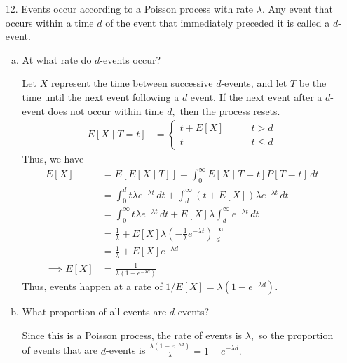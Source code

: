 \documentclass{article}
\begin{document}
\begin{itemize}
	\item[12.] Events occur according to a Poisson process with rate $\lambda.$ Any event that occurs within a time $d$ of the event that immediately preceded it is called a $d$-event.
		\begin{enumerate}[(a)]
			\item At what rate do $d$-events occur?
				\begin{soln}
					Let $X$ represent the time between successive $d$-events, and let $T$ be the time until the next event following a $d$ event. If the next event after a $d$-event does not occur within time $d,$ then the process resets.
					\begin{align*}
						E[X\mid T=t] &= \begin{cases}
							t+E[X] \quad\quad &t> d \\
							t \quad\quad\quad &t\le d
						\end{cases}
					\end{align*}
					Thus, we have
					\begin{align*}
						E[X] &= E[E[X\mid T]] = \int_0^\infty E[X\mid T=t] P[T=t]\, dt \\
						&= \int_0^d t \lambda e^{-\lambda t}\, dt + \int_d^\infty (t+E[X]) \lambda e^{-\lambda t}\, dt \\
						&= \int_0^\infty t\lambda e^{-\lambda t}\, dt + E[X]\lambda \int_d^\infty e^{-\lambda t}\, dt \\
						&= \frac{1}{\lambda} + E[X] \lambda \left( -\frac{1}{\lambda} e^{-\lambda t} \right)\bigg\vert_d^\infty \\
						&= \frac{1}{\lambda} + E[X] e^{-\lambda d} \\
						\implies E[X] &= \frac{1}{\lambda(1-e^{-\lambda d})}
					\end{align*}
					Thus, events happen at a rate of $1/E[X]=\lambda(1-e^{-\lambda d}).$
				\end{soln}

			\item What proportion of all events are $d$-events?
				\begin{soln}
					Since this is a Poisson process, the rate of events is $\lambda,$ so the proportion of events that are $d$-events is $\frac{\lambda(1-e^{-\lambda d})}{\lambda} = 1-e^{-\lambda d}.$
				\end{soln}
				
		\end{enumerate}
		
\end{itemize}
\end{document}
